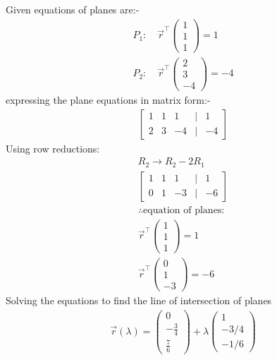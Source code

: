 \documentclass[journal]{IEEEtran}
\begin{document}
Given equations of planes are:-
\begin{align}
P_1: \quad \vec{r}^\top \begin{pmatrix} 1 \\ 1 \\ 1 \end{pmatrix} = 1\\
P_2: \quad \vec{r}^\top \begin{pmatrix} 2 \\ 3 \\ -4 \end{pmatrix} = -4
\end{align}
expressing the plane equations in matrix form:-
\begin{align}
\begin{bmatrix}1 & 1 & 1 & | & 1 \\2 & 3 & -4 & | & -4\end{bmatrix}
\end{align}
Using row reductions:
\begin{align}
R_2 \rightarrow R_2 - 2R_1\\
\begin{bmatrix}1 & 1 & 1 & | & 1 \\0 & 1 & -3 & | & -6\end{bmatrix}\\
\therefore \text{equation of planes:}\\
\vec{r}^\top \begin{pmatrix} 1 \\ 1 \\ 1 \end{pmatrix} = 1\\
\vec{r}^\top \begin{pmatrix} 0 \\ 1 \\ -3 \end{pmatrix} = -6
\end{align}
Solving the equations to find the line of intersection of planes\\
\begin{align}
\vec{r}(\lambda) = \begin{pmatrix}0 \\-\frac{3}{4} \\\frac{7}{6}\end{pmatrix} + \lambda \begin{pmatrix}1 \\-3/4 \\-1/6\end{pmatrix}
\end{align}\\
\end{document}

